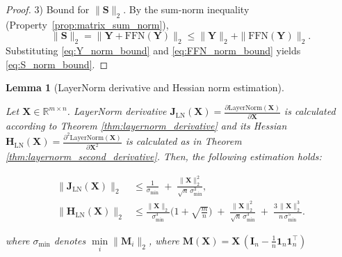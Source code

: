 \documentclass{article}
\newtheorem{lemma}{Lemma}
\begin{document}
\begin{proof}
3) Bound for $\|\mathbf{S}\|_2$.
By the sum-norm inequality (Property~\ref{prop:matrix_sum_norm}),
\[\|\mathbf{S}\|_2=\|\mathbf{Y}+\mathrm{FFN}(\mathbf{Y})\|_2\le \|\mathbf{Y}\|_2 + \|\mathrm{FFN}(\mathbf{Y})\|_2.\]
Substituting \eqref{eq:Y_norm_bound} and \eqref{eq:FFN_norm_bound} yields \eqref{eq:S_norm_bound}.
\end{proof}

\begin{lemma} [LayerNorm derivative and Hessian norm estimation] \label{lemma:layernorm_deriv_hessian_norm}

Let $\mathbf{X} \in \mathbb{R}^{m \times n}$. LayerNorm derivative $\mathbf{J}_{\mathrm{LN}}(\mathbf{X}) = \frac{\partial \text{LayerNorm}(\mathbf{X})}{\partial \mathbf{X}}$ is calculated according to Theorem \ref{thm:layernorm_derivative} and its Hessian $\mathbf{H}_{\mathrm{LN}}(\mathbf{X}) = \frac{\partial^2 \text{LayerNorm}(\mathbf{X})}{\partial \mathbf{X}^2}$ is calculated as in Theorem \ref{thm:layernorm_second_derivative}. Then, the following estimation holds:

\begin{align}
\big\|\mathbf{J}_{\mathrm{LN}}(\mathbf{X})\big\|_2
&\le \frac{1}{\sigma_{\min}} \;+\; \frac{\|\mathbf{X}\|_2^2}{\sqrt{n}\,\sigma_{\min}^3}, \label{eq:ln_jac_norm_bound}\\[4pt]
\big\|\mathbf{H}_{\mathrm{LN}}(\mathbf{X})\big\|_2
&\le \frac{\|\mathbf{X}\|_2}{\sigma_{\min}^3}\Big(1+\sqrt{\tfrac{m}{n}}\Big)
\;+\; \frac{\|\mathbf{X}\|_2^2}{\sqrt{n}\,\sigma_{\min}^3}
\;+\; \frac{3\,\|\mathbf{X}\|_2^3}{n\,\sigma_{\min}^5}.
\label{eq:ln_hess_norm_bound}
\end{align}

where $\sigma_{\min}$ denotes $\min \limits_i \|\mathbf{M}_i \|_2$, where $\mathbf{M}(\mathbf{X}) = \mathbf{X}\,(\mathbf{I}_n - \tfrac{1}{n}\mathbf{1}_n\mathbf{1}_n^\top)$
    
\end{lemma}
\end{document}
